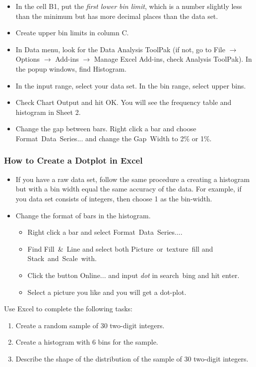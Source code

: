 \begin{itemize}
\item
  In the cell \textsf{B1}, put the \emph{first lower bin limit}, which
  is a number slightly less than the minimum but has more decimal places
  than the data set.
\item
  Create upper bin limits in column C.
\item
  In Data menu, look for the Data Analysis ToolPak (if not, go to File
  $\rightarrow$ Options $\rightarrow$ Add-ins $\rightarrow$ Manage
  Excel Add-ins, check Analysis ToolPak). In the popup windows, find
  Histogram.
\item
  In the input range, select your data set. In the bin range, select
  upper bins.
\item
  Check Chart Output and hit OK. You will see the frequency table and
  histogram in Sheet 2.
\item
  Change the gap between bars. Right click a bar and choose
  \textsf{Format\ Data\ Series...} and change the \textsf{Gap\ Width} to
  2\% or 1\%.
\end{itemize}

\hypertarget{how-to-create-a-dotplot-in-excel}{%
\subsubsection{How to Create a Dotplot in
Excel}\label{how-to-create-a-dotplot-in-excel}}

\begin{itemize}
\item
  If you have a raw data set, follow the same procedure a creating a
  histogram but with a bin width equal the same accuracy of the data.
  For example, if you data set consists of integers, then choose 1 as
  the bin-width.
\item
  Change the format of bars in the histogram.

  \begin{itemize}
  \item
    Right click a bar and select \textsf{Format\ Data\ Series...}.
  \item
    Find \textsf{Fill\ \&\ Line} and select both
    \textsf{Picture\ or\ texture\ fill} and
    \textsf{Stack\ and\ Scale\ with}.
  \item
    Click the button \textsf{Online...} and input \emph{dot} in
    \textsf{search\ bing} and hit enter.
  \item
    Select a picture you like and you will get a dot-plot. 
  \end{itemize}
\end{itemize}

\begin{exercise}
Use Excel to complete the following tasks:
\begin{enumerate}[sepno]
\item
  Create a random sample of 30 two-digit integers.
\item
  Create a histogram with 6 bins for the sample.
\item
  Describe the shape of the distribution of the sample of 30 two-digit
  integers.
\end{enumerate}
\end{exercise}